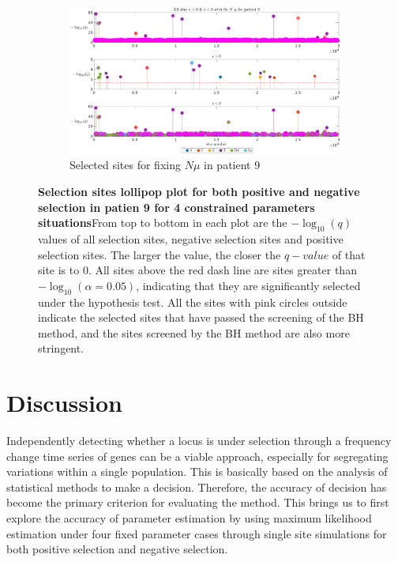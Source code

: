 \documentclass[12pt]{article}
\begin{document}
\begin{figure}[H]
    \ContinuedFloat

    
    \begin{subfigure}{0.7\textwidth}
    
    
        \hspace{-2.5cm}
            \includegraphics[height=0.45\textheight]{figures/patient/pt9/pt9_siteunder_selection_all_fixNmu.eps}
        
        \caption{Selected sites for fixing $N \mu$ in patient 9}
        \label{fig:subfig4}
    \end{subfigure}
    
    \caption{\textbf{Selection sites lollipop plot for both positive and negative selection in patien 9 for 4 constrained parameters situations}From top to bottom in each plot are the $-\log_{10}(q)$ values of all selection sites, negative selection sites and positive selection sites. The larger the value, the closer the $q-value$ of that site is to 0. All sites above the red dash line are sites greater than $-\log_{10}(\alpha=0.05)$, indicating that they are significantly selected under the hypothesis test. All the sites with pink circles outside indicate the selected sites that have passed the screening of the BH method, and the sites screened by the BH method are also more stringent.}
    \label{fig:four_subfigs}
\end{figure}


\newpage
\section{Discussion}
Independently detecting whether a locus is under selection through a frequency change time series of genes can be a viable approach, especially for segregating variations within a single population. This is basically based on the analysis of statistical methods to make a decision. Therefore, the accuracy of decision has become the primary criterion for evaluating the method. This brings us to first explore the accuracy of parameter estimation by using maximum likelihood estimation under four fixed parameter cases through single site simulations for both positive selection and negative selection.\\
\end{document}
